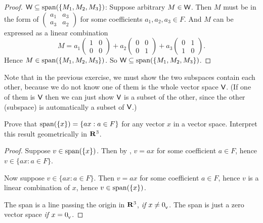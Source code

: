 \begin{proof}
\(\textsf{W} \subseteq \operatorname{span}(\{M_1, M_2, M_3\})\):
Suppose arbitrary \(M \in \textsf{W}\).
Then \(M\) must be in the form of
\(
    \begin{pmatrix}
        a_1 & a_3 \\
        a_3 & a_2
    \end{pmatrix}
\) for some coefficients \(a_1, a_2, a_3 \in F\).
And \(M\) can be expressed as a linear combination
\[
    M = a_1 \begin{pmatrix}
            1 & 0 \\
            0 & 0
        \end{pmatrix}
        + a_2 \begin{pmatrix}
            0 & 0 \\
            0 & 1
        \end{pmatrix}
        + a_3 \begin{pmatrix}
            0 & 1 \\
            1 & 0
        \end{pmatrix}.
\]
Hence \(M \in \operatorname{span}(\{M_1, M_2, M_3\})\).
So \(\textsf{W} \subseteq \operatorname{span}(\{M_1, M_2, M_3\})\).
\end{proof}

\begin{note}
Note that in the previous exercise, we must show the two subspaces contain each other, because we do not know one of them is the whole vector space \(\textsf{V}\).
(If one of them is \(\textsf{V}\) then we can just show \(\textsf{V}\) is a subset of the other, since the other (subspace) is automatically a subset of \(\textsf{V}\).)
\end{note}

\begin{exercise} \label{exercise 1.4.11}
Prove that \(\operatorname{span}(\{ x \}) = \{ ax: a \in F \}\) for any vector \(x\) in a vector space.
Interpret this result geometrically in \(\mathbf{R}^3\).
\end{exercise}

\begin{proof}
Suppose \(v \in \operatorname{span}(\{ x \})\).
Then by , \(v = a x\) for some coefficient \(a \in F\), hence \(v \in \{ ax: a \in F \}\).

Now suppose \(v \in \{ ax: a \in F \}\).
Then \(v = a x\) for some coefficient \(a \in F\), hence \(v\) is a linear combination of \(x\), hence \(v \in \operatorname{span}(\{ x\})\).

The span is a line passing the origin in \(\mathbf{R}^3\), \emph{if} \(x \ne 0_{_{\textsf{V}}}\).
The span is just a zero vector space \emph{if} \(x = 0_{_{\textsf{V}}}\).
\end{proof}

